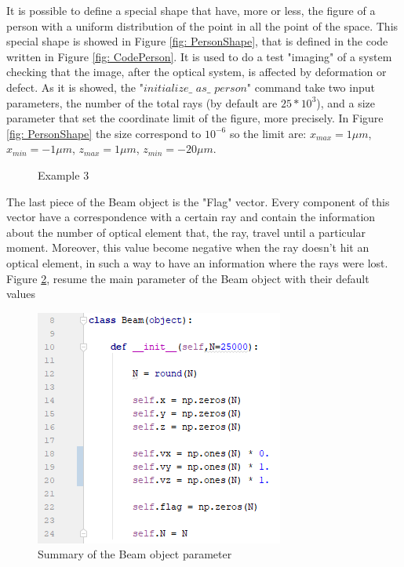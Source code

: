 It is possible to define a special shape that have, more or less, the figure of a person with a uniform distribution of the point in all the point of the space. This special shape is showed in Figure \ref{fig: PersonShape}, that is defined in the code written in Figure \ref{fig: CodePerson}. It is used to do a test "imaging" of a system checking that the image, after the optical system, is affected by deformation or defect. As it is showed, the "$initialize\_$ $as\_$ $person$" command take two input parameters, the number of the total rays (by default are $25*10^3 $), and a size parameter that set the coordinate limit of the figure, more precisely. In Figure \ref{fig: PersonShape} the size correspond to $10^{-6} $ so the limit are: $x_{max} =  1\mu m $, $x_{min} = -1\mu m $, $z_{max} = 1\mu m $, $z_{min} = - 20\mu m $.\begin{figure}[H]
%
\centering
%
\quad
%
%
\caption{Example 3}
\label{fig :p3}
\end{figure}
The last piece of the Beam object is the "Flag" vector. Every component of this vector have a correspondence with a certain ray and contain the information about the number of optical element that, the ray, travel until a particular moment. Moreover, this value become negative when the ray doesn't hit an optical element, in such a way to have an information where the rays were lost. Figure \ref{fig: ResumeBeam}, resume the main parameter of the Beam object with their default values
\begin{figure}[H]
%
\centering
%
\includegraphics[width=.4\textwidth]{Immagini/Chapter3/ResumeBeam}
%
\caption{Summary of the Beam object parameter}
%
\label{fig: ResumeBeam}
%
\end{figure}
